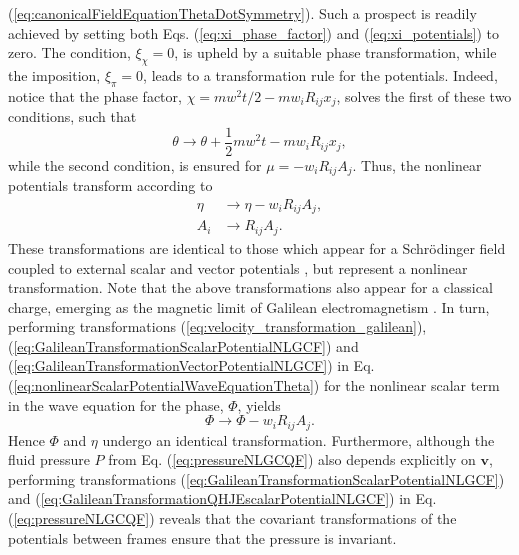 \documentclass[twocolumn, nofootinbib, nobibnotes, amsmath,amssymb,aps, pra, floatfix]{revtex4-1}
\renewcommand{\v}[1]{\ensuremath{\mathbf{#1}}} %
\begin{document}
(\ref{eq:canonicalFieldEquationThetaDotSymmetry}).
Such a prospect is readily achieved by setting both Eqs. (\ref{eq:xi_phase_factor}) and (\ref{eq:xi_potentials}) to zero.
The condition, $\xi_{\chi}=0$, is upheld by a suitable phase transformation, while the imposition, $\xi_{\pi}=0$, leads to a transformation rule for the potentials.
Indeed, notice that the phase factor, $\chi=mw^2t/2-mw_iR_{ij}x_j$, solves the first of these two conditions, such that \cite{holland1995quantum,brown1999galilean}
\begin{equation}
    \theta\rightarrow\theta+\frac{1}{2}mw^2t-mw_iR_{ij}x_j,
  \label{eq:phase_transformation_galilean_elementary_fluid}
\end{equation}
while the second condition, is ensured for $\mu=-w_iR_{ij}A_j$.
Thus, the nonlinear potentials transform according to
\begin{align}
  \eta&\rightarrow\eta-w_iR_{ij}A_j, \label{eq:GalileanTransformationScalarPotentialNLGCF} \\
  A_i&\rightarrow R_{ij}A_j. \label{eq:GalileanTransformationVectorPotentialNLGCF}
\end{align}
These transformations are identical to those which appear for a Schr\"odinger field coupled to external scalar and vector potentials \cite{brown1999galilean}, but represent a nonlinear transformation. 
Note that the above transformations also appear for a classical charge, emerging as the magnetic limit of Galilean electromagnetism \cite{le1973galilean}.
In turn, performing transformations (\ref{eq:velocity_transformation_galilean}), (\ref{eq:GalileanTransformationScalarPotentialNLGCF}) and (\ref{eq:GalileanTransformationVectorPotentialNLGCF}) in Eq. (\ref{eq:nonlinearScalarPotentialWaveEquationTheta}) for the nonlinear scalar term in the wave equation for the phase, $\Phi$, yields
\begin{equation}
  \Phi\rightarrow\Phi-w_iR_{ij}A_j.
  \label{eq:GalileanTransformationQHJEscalarPotentialNLGCF}
\end{equation}
Hence $\Phi$ and $\eta$ undergo an identical transformation.
Furthermore, although the fluid pressure $P$ from Eq. (\ref{eq:pressureNLGCQF}) also depends explicitly on $\v{v}$, performing transformations (\ref{eq:GalileanTransformationScalarPotentialNLGCF}) and (\ref{eq:GalileanTransformationQHJEscalarPotentialNLGCF}) in Eq. (\ref{eq:pressureNLGCQF}) reveals that the covariant transformations of the potentials between frames ensure that the pressure is invariant.\\
\end{document}

